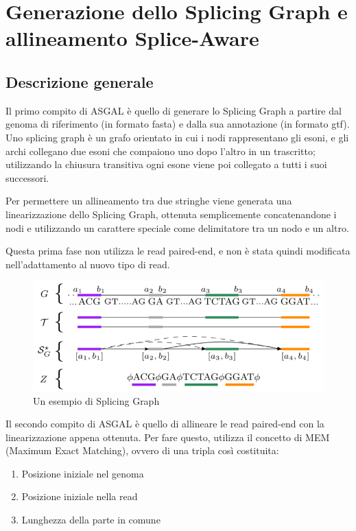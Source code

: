 \section{Generazione dello Splicing Graph e allineamento Splice-Aware}

\subsection{Descrizione generale}

Il primo compito di ASGAL è quello di generare lo Splicing Graph a partire dal genoma di riferimento (in formato fasta) e dalla sua annotazione (in formato gtf). Uno splicing graph è un grafo orientato in cui i nodi rappresentano gli esoni, e gli archi collegano due esoni che compaiono uno dopo l'altro in un trascritto; utilizzando la chiusura transitiva ogni esone viene poi collegato a tutti i suoi successori.

Per permettere un allineamento tra due stringhe viene generata una linearizzazione dello Splicing Graph, ottenuta semplicemente concatenandone i nodi e utilizzando un carattere speciale come delimitatore tra un nodo e un altro. 

Questa prima fase non utilizza le read paired-end, e non è stata quindi modificata nell'adattamento al nuovo tipo di read.

\begin{figure}[h!]
	\centering
	\includegraphics{images/splicinggraph.png}
  \caption{Un esempio di Splicing Graph}
  \label{fig:PairedEndReads}
\end{figure}

Il secondo compito di ASGAL è quello di allineare le read paired-end con la linearizzazione appena ottenuta. Per fare questo, utilizza il concetto di MEM (Maximum Exact Matching), ovvero di una tripla così costituita:
\begin{enumerate}
	\item Posizione iniziale nel genoma
	\item Posizione iniziale nella read
	\item Lunghezza della parte in comune
\end{enumerate}
	
